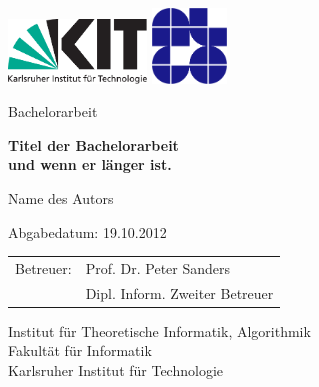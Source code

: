 \documentclass[12pt,a4paper,twoside]{scrartcl}
\numberwithin{equation}{section}
\begin{document}

\pagestyle{empty} %

\begin{titlepage}

  \begin{center}\large

    \quad\includegraphics[height=17mm]{kit_logo_de.pdf} \hfill
    \includegraphics[height=20mm]{grouplogo-algo-blue.pdf}\quad\null

    \vfill

    Bachelorarbeit
    \vspace*{2cm}

    {\bf\huge Titel der Bachelorarbeit \\ und wenn er länger ist. \par}

    \vfill

    Name des Autors

    \vspace*{15mm}

    Abgabedatum: 19.10.2012

    \vspace*{45mm}

    \begin{tabular}{rl}
      Betreuer: & Prof. Dr. Peter Sanders \\
      & Dipl. Inform. Zweiter Betreuer \\
    \end{tabular}
    
    \vspace*{10mm}

    Institut für Theoretische Informatik, Algorithmik \\
    Fakultät für Informatik \\
    Karlsruher Institut für Technologie


    \vspace*{12mm}
  \end{center}

\end{titlepage}
\end{document}
